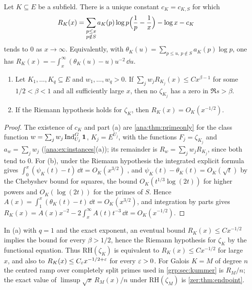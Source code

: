 \begin{proposition}\label{nab:prop:dedekind}
Let $K\subseteq E$ be a subfield. There is a unique constant $c_K=c_{K,S}$ for which
\[
 R_K(x)=\sum_{\substack{p\le x\\p\notin S}}a_K(p)\log p\Bigl(\frac1p-\frac1x\Bigr)-\log x-c_K
\]
tends to $0$ as $x\to\infty$. Equivalently, with
$\theta_K(u)=\sum_{p\le u,\,p\notin S}a_K(p)\log p$, one has
$R_K(x)=-\int_x^\infty(\theta_K(u)-u)u^{-2}\,\dd u$.
\begin{enumerate}[label=\textup{(\alph*)}]
\item Let $K_1,\dots,K_q\subseteq E$ and $w_1,\dots,w_q>0$. If
$\sum_jw_jR_{K_j}(x)\le Cx^{\beta-1}$ for some $1/2<\beta<1$ and all sufficiently large
$x$, then no $\zeta_{K_j}$ has a zero in $\Re s>\beta$.
\item If the Riemann hypothesis holds for $\zeta_K$, then $R_K(x)=O_K(x^{-1/2})$.
\end{enumerate}
\end{proposition}
\begin{proof}
The existence of $c_K$ and part (a) are \cref{ana:thm:primeonly} for the class function
$w=\sum_jw_j\operatorname{Ind}_{U_j}^G\mathbf{1}$, $K_j=E^{U_j}$, with the functions $F_j=\zeta_{K_j}$ and
$a_w=\sum_jw_j$ (\cref{ana:ex:instances}(a)); its remainder is $R_w=\sum_jw_jR_{K_j}$, since
both tend to $0$. For (b), under the Riemann hypothesis
the integrated explicit formula gives $\int_0^x(\psi_K(t)-t)\,\dd t=O_K(x^{3/2})$
\cite{GrenieMolteni2016Smoothed}, and $\psi_K(t)-\theta_K(t)=O_K(\sqrt t)$ by the Chebyshev
bound for squares, the bound $O_K(t^{1/3}\log(2t))$ for higher powers and $O_K(\log(2t))$
for the primes of $S$. Hence $A(x)=\int_1^x(\theta_K(t)-t)\,\dd t=O_K(x^{3/2})$, and
integration by parts gives $R_K(x)=A(x)x^{-2}-2\int_x^\infty A(t)t^{-3}\,\dd t=O_K(x^{-1/2})$.
\end{proof}

\begin{remark}\label{grp:prop:split}
In (a) with $q=1$ and the exact exponent, an eventual bound $R_K(x)\le Cx^{-1/2}$ implies
the bound for every $\beta>1/2$, hence the Riemann hypothesis for $\zeta_K$ by the
functional equation. Thus $\mathrm{RH}(\zeta_K)$ is equivalent to $R_K(x)\le Cx^{-1/2}$
for large $x$, and also to $R_K(x)\le C_\varepsilon x^{-1/2+\varepsilon}$ for every $\varepsilon>0$. For
Galois $K=M$ of degree $n$ the centred ramp over completely split primes used in
\cref{grp:sec:kummer} is $R_M/n$; the exact value of $\limsup\sqrt x\,R_M(x)/n$ under
$\mathrm{RH}(\zeta_M)$ is \cref{zer:thm:endpoint}.
\end{remark}

